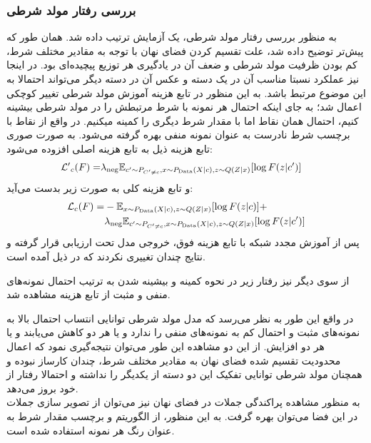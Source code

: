 \subsubsection{بررسی رفتار مولد شرطی}
به منظور بررسی رفتار مولد شرطی، یک آزمایش ترتیب داده شد. همان طور که پیش‌تر توضیح داده شد، علت تقسیم کردن فضای نهان با توجه به مقادیر مختلف شرط، کم بودن ظرفیت مولد شرطی و ضعف آن در یادگیری هر توزیع پیچیده‌ای بود. در اینجا نیز عملکرد نسبتا مناسب آن در یک دسته و عکس آن در دسته دیگر می‌تواند احتمالا به این موضوع مرتبط باشد. به این منظور در تابع هزینه آموزش مولد شرطی تغییر کوچکی اعمال شد؛ به جای اینکه احتمال هر نمونه با شرط مرتبطش را در مولد شرطی بیشینه کنیم، احتمال همان نقاط اما با مقدار شرط دیگری را کمینه میکنیم. در واقع از نقاط با برچسب شرط نادرست به عنوان نمونه منفی بهره گرفته می‌شود. به صورت صوری تابع هزینه ذیل به تابع هزینه اصلی افزوده می‌شود:
\begin{align}
\mathcal{L'}_c (F) = & \lambda_\text{neg} \mathbb E_{c' \sim P_{C'\neq c}, x \sim P_\text{Data}(X|c), z \sim Q(Z|x)} [\log F(z|c')]
\end{align}
و تابع هزینه کلی به صورت زیر بدست می‌آید:
\begin{align}
\mathcal{L}_c (F) = & - \mathbb E_{x \sim P_\text{Data}(X|c), z \sim Q(Z|x)} [\log F(z|c)] +\\
& \lambda_\text{neg} \mathbb E_{c' \sim P_{C'\neq c}, x \sim P_\text{Data}(X|c), z \sim Q(Z|x)} [\log F(z|c')]
\end{align}
پس از آموزش مجدد شبکه با تابع هزینه فوق، خروجی مدل تحت ارزیابی قرار گرفته و نتایج چندان تغییری نکردند که در ذیل آمده است.

از سوی دیگر نیز رفتار زیر در نحوه کمینه و بیشینه شدن به ترتیب احتمال نمونه‌های منفی و مثبت از تابع هزینه مشاهده شد.

در واقع این طور به نظر می‌رسد که مدل مولد شرطی توانایی انتساب احتمال بالا به نمونه‌های مثبت و احتمال کم به نمونه‌های منفی را ندارد و یا هر دو کاهش می‌یابند و یا هر دو افزایش. از این دو مشاهده این طور می‌توان نتیجه‌گیری نمود که اعمال محدودیت تقسیم شده فضای نهان به مقادیر مختلف شرط، چندان کارساز نبوده و همچنان مولد شرطی توانایی تفکیک این دو دسته از یکدیگر را نداشته و احتمالا رفتار \meanseeking{} از خود بروز می‌دهد.
\\
به منظور مشاهده پراکندگی جملات در فضای نهان نیز می‌توان از تصویر سازی جملات در این فضا می‌توان بهره گرفت. به این منظور، از الگوریتم  و برچسب مقدار شرط به عنوان رنگ هر نمونه استفاده شده است.


